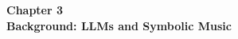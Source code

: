 \begin{center}

    \thispagestyle{empty}
    \vspace*{\fill}
    
    \Huge 
    \textbf{Chapter 3\\ Background: LLMs and Symbolic Music}
       

    \vspace*{\fill}
\end{center}